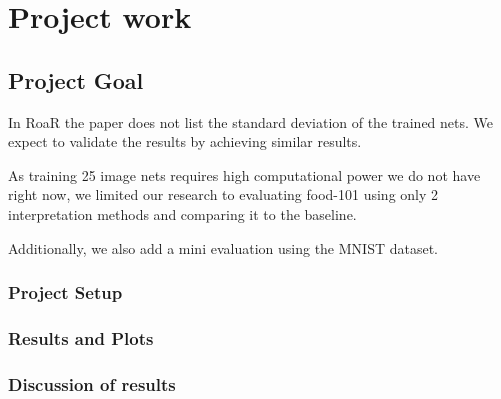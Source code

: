 \chapter{Project work} %
\label{sec:project}

\section{Project Goal}
In RoaR\cite{hooker2019benchmark} the paper does not list the standard deviation of the trained nets. We expect to validate the results by achieving similar results.

As training 25 image nets requires high computational power we do not have right now, we limited our research to evaluating food-101 \cite{bossard14} using only 2 interpretation methods and comparing it to the baseline.


Additionally, we also add a mini evaluation using the MNIST dataset.



\subsection{Project Setup}




\subsection{Results and Plots}

\subsection{Discussion of results}






